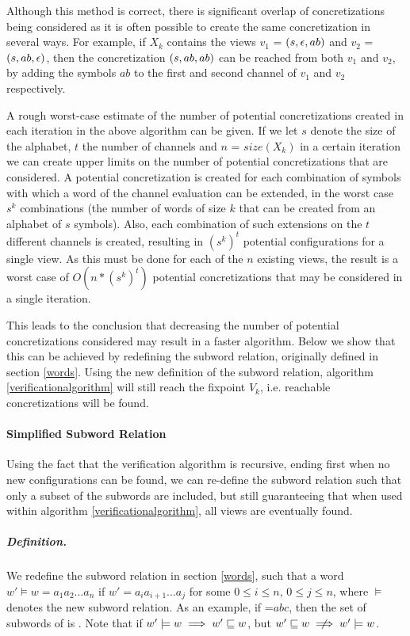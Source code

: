 Although this method is correct, there is significant overlap of concretizations being considered as it is often possible to create the same concretization  in several ways. For example, if $X_k$ contains the views $v_1$ = $(s, \epsilon, ab)$ and $v_2$ = $(s, ab, \epsilon)$, then the concretization $(s, ab,ab)$ can be reached from both $v_1$ and $v_2$, by adding the symbols $ab$ to the first and second channel of $v_1$ and $v_2$ respectively.

A rough worst-case estimate of the number of potential concretizations created in each iteration in the above algorithm can be given. If we let $s$ denote the size of the alphabet, $t$ the number of channels and $n$ = $size(X_k)$ in a certain iteration we can create upper limits on the number of potential concretizations that are considered. A potential concretization is created for each combination of symbols with which a word of the channel evaluation can be extended, in the worst case $s^k$ combinations (the number of words of size $k$ that can be created from an alphabet of $s$ symbols). Also, each combination of such extensions on the $t$ different channels is created, resulting in $(s^k)^t$ potential configurations for a single view. As this must be done for each of the $n$ existing views, the result is a worst case of $O(n*(s^k)^t)$ potential concretizations that may be considered in a single iteration.

This leads to the conclusion that decreasing the number of potential concretizations considered may result in a faster algorithm. Below we show that this can be achieved by redefining the subword relation, originally defined in section \ref{words}. Using the new definition of the subword relation, algorithm \ref{verificationalgorithm} will still reach the fixpoint $V_k$, i.e. reachable concretizations will be found.

\paragraph{Simplified Subword Relation}
Using the fact that the verification algorithm is recursive, ending first when no new configurations can be found, we can re-define the subword relation such that only a subset of the subwords are included, but still guaranteeing that when used within algorithm \ref{verificationalgorithm}, all views are eventually found.

\subparagraph{Definition.} 
\label{newsubword}
We redefine the subword relation in section \ref{words}, such that a word $w' \models w = a_1a_2\ldots a_n$ if $w' = a_ia_{i+1}\ldots a_j$ for some $0 \leq i \leq n$, $0 \leq j \leq n$, where $\models$ denotes the new subword relation. As an example, if =$abc$, then the set of subwords of  is . Note that if $w' \models w \implies w' \sqsubseteq w$, but $w' \subword w \centernot\implies w' \models w$. 

